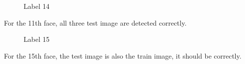 \documentclass[letterpaper]{polythesis}
\begin{document}
\begin{figure}[htbp]
\caption{Label 14}
  \label{fig:result 14} %
\end{figure}

For the 11th face, all three test image are detected correctly.

\newpage


\begin{figure}[htbp]
  \centering
  \caption{Label 15}
  \label{fig:result 15.1} %
\end{figure}

For the 15th face, the test image is also the train image, it should be correctly.
\end{document}
